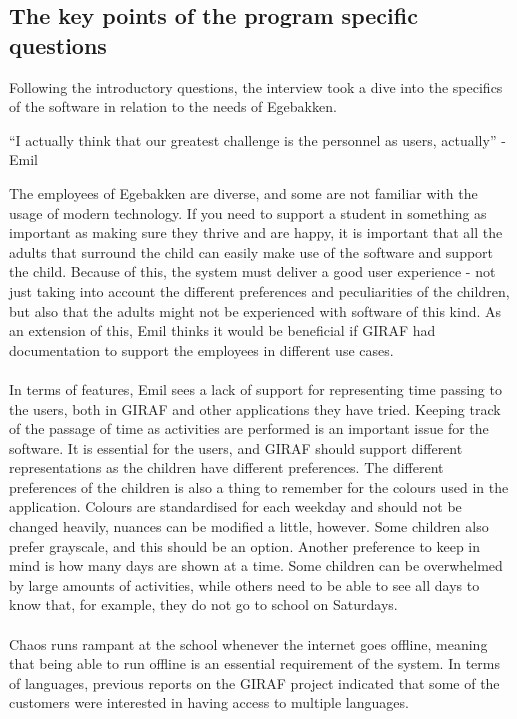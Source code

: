 \subsection{The key points of the program specific questions}
Following the introductory questions, the interview took a dive into the specifics of the software in relation to the needs of Egebakken.
\begin{displayquote}
    ``I actually think that our greatest challenge is the personnel as users, actually''  - Emil
\end{displayquote}
The employees of Egebakken are diverse, and some are not familiar with the usage of modern technology.
If you need to support a student in something as important as making sure they thrive and are happy, it is important that all the adults that surround the child can easily make use of the software and support the child.
Because of this, the system must deliver a good user experience - not just taking into account the different preferences and peculiarities of the children, but also that the adults might not be experienced with software of this kind.
As an extension of this, Emil thinks it would be beneficial if GIRAF had documentation to support the employees in different use cases.
\\\\
In terms of features, Emil sees a lack of support for representing time passing to the users, both in GIRAF and other applications they have tried.
Keeping track of the passage of time as activities are performed is an important issue for the software.
It is essential for the users, and GIRAF should support different representations as the children have different preferences.
The different preferences of the children is also a thing to remember for the colours used in the application.
Colours are standardised for each weekday and should not be changed heavily, nuances can be modified a little, however.
Some children also prefer grayscale, and this should be an option.
Another preference to keep in mind is how many days are shown at a time.
Some children can be overwhelmed by large amounts of activities, while others need to be able to see all days to know that, for example, they do not go to school on Saturdays.
\\\\
Chaos runs rampant at the school whenever the internet goes offline, meaning that being able to run offline is an essential requirement of the system.
In terms of languages, previous reports on the GIRAF project indicated that some of the customers were interested in having access to multiple languages.
